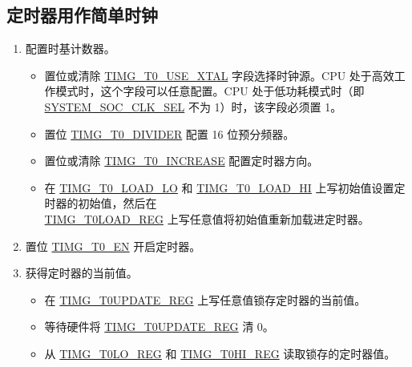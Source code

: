 \documentclass[main\_\_CN.tex]{subfiles}
\begin{document}
\subsection{定时器用作简单时钟}\label{sec:timg-func-descr-simple-clock}
\begin{enumerate}
    \item 配置时基计数器。
        \begin{itemize}
        \item 置位或清除 \hyperref[fielddesc:TIMGTXUSEXTAL]{TIMG\_T0\_USE\_XTAL} 字段选择时钟源。CPU 处于高效工作模式时，这个字段可以任意配置。CPU 处于低功耗模式时（即 \hyperref[fielddesc:SYSTEMSOCCLKSEL]{SYSTEM\_SOC\_CLK\_SEL} 不为 1）时，该字段必须置 1。
        \item 置位 \hyperref[fielddesc:TIMGTXDIVIDER]{TIMG\_T0\_DIVIDER} 配置 16 位预分频器。
        \item 置位或清除 \hyperref[fielddesc:TIMGTXINCREASE]{TIMG\_T0\_INCREASE} 配置定时器方向。
        \item 在 \hyperref[fielddesc:TIMGTXLOADLO]{TIMG\_T0\_LOAD\_LO} 和 \hyperref[fielddesc:TIMGTXLOADHI]{TIMG\_T0\_LOAD\_HI} 上写初始值设置定时器的初始值，然后在 \\\hyperref[regdesc:TIMGTXLOADREG]{TIMG\_T0LOAD\_REG} 上写任意值将初始值重新加载进定时器。
    \end{itemize}
    \item 置位 \hyperref[fielddesc:TIMGTXEN]{TIMG\_T0\_EN} 开启定时器。
    \item 获得定时器的当前值。
    \begin{itemize}
        \item 在 \hyperref[regdesc:TIMGTXUPDATEREG]{TIMG\_T0UPDATE\_REG} 上写任意值锁存定时器的当前值。
        \item 等待硬件将 \hyperref[regdesc:TIMGTXUPDATEREG]{TIMG\_T0UPDATE\_REG} 清 0。
        \item 从 \hyperref[regdesc:TIMGTXLOREG]{TIMG\_T0LO\_REG} 和 \hyperref[regdesc:TIMGTXHIREG]{TIMG\_T0HI\_REG} 读取锁存的定时器值。
    \end{itemize}
\end{enumerate}
\end{document}
